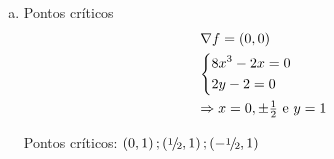 \documentclass{book}
\begin{document}
\begin{enumerate}
\begin{sol}
\begin{enumerate}[(a)]
        Portanto, $g$ \'e crescente e sobrejetora.

        Ent\~ao, $\exists !z_0  \in \R$ tal que $g\left( {z_0 } \right) = 0$.

\[
\begin{gathered}
  F\left( {x_0 ,y_0 ,z_0 } \right) = 0 \hfill \\
  \frac{{\partial F}}
{{\partial z}}\left( {x_0 ,y_0 ,z_0 } \right) = \left. {3z^2  + 3} \right|_{z = z_0 }  = 3z_0^2  + 3 > 0 \hfill \\
\end{gathered}
\]

        Pelo Teorema da Fun\c{c}\~ao Impl\'icita \ref{sec17}, $\exists A \subset \R^2$ e $B \subset \R$ tal que $\left( {x_0 ,y_0 } \right) \in A$ e $z_0 \in B$ e $F\left( {x,y,z} \right) = 0,\forall \left( {x,y} \right) \in A$ e $z \in B$.

        $z=f(x,y)$ e \'e de mesma diferenciabilidade que $F$.

\[
\begin{gathered}
  f_x \left( {x,y} \right) =  - \frac{{F_x }}
{{F_z }} = \frac{{ - \left( {8x^3  - 2x} \right)}}
{{3z^2  + 3}} \hfill \\
  f_y \left( {x,y} \right) =  - \frac{{F_y }}
{{F_z }} = \frac{{ - \left( {2y - 2} \right)}}
{{3z^2  + 3}} \hfill \\
\end{gathered}
\]

        onde, $z=f(x,y)$.

    \item Pontos cr\'iticos
\[
\begin{gathered}
  \nabla f = \left( {0,0} \right) \hfill \\
  \left\{ \begin{gathered}
  8x^3  - 2x = 0 \hfill \\
  2y - 2 = 0 \hfill \\
\end{gathered}  \right. \hfill \\
   \Rightarrow x = 0, \pm \tfrac{1}
{2}{\text{ e }}y = 1 \hfill \\
\end{gathered}
\]

        Pontos cr\'iticos: $\left( {0,1} \right);\left( {{\raise0.5ex\hbox{$\scriptstyle 1$}\kern-0.1em/\kern-0.15em
\lower0.25ex\hbox{$\scriptstyle 2$}},1} \right);\left( { - {\raise0.5ex\hbox{$\scriptstyle 1$}\kern-0.1em/\kern-0.15em
\lower0.25ex\hbox{$\scriptstyle 2$}},1} \right)$


\end{enumerate}
\end{sol}
\end{enumerate}
\end{document}
